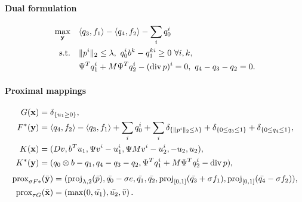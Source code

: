 \paragraph{Dual formulation}
\begin{align*}
    \max_{\mathbf{y}} \quad
        & \langle q_3, f_1 \rangle - \langle q_4, f_2 \rangle - \sum_i q_0^i  \\
    \text{s.t.}\quad
        & \|p^{i}\|_{2} \leq \lambda,
          ~q_0^i b^k - q_1^{ki} \geq 0 ~\forall i, k, \\
        & \Psi^T q_1^i + M \Psi^T q_2^i - (\operatorname{div} p)^i = 0,
          ~q_4 - q_3 - q_2 = 0.
\end{align*}

\paragraph{Proximal mappings}
\begin{align*}
    G(\mathbf{x}) &= \delta_{\{u_1 \geq 0\}}, \\
    F^*(\mathbf{y}) &= \langle q_4, f_2 \rangle - \langle q_3, f_1 \rangle
        + \sum_{i} q_0^i
        + \sum_{i} \delta_{\{\|p^{i}\|_{2} \leq \lambda\}}
        + \delta_{\{0 \leq q_3 \leq 1\}} + \delta_{\{0 \leq q_4 \leq 1\}}, \\
    K(\mathbf{x}) &= (
        Dv,
        b^T u_1,
        \Psi v^i - u_1^i,
        \Psi M v^i - u_2^i,
        -u_2,
        u_2
    ), \\
    K^*(\mathbf{y}) &= (
        q_0 \otimes b - q_1,
        q_4 - q_3 - q_2,
        \Psi^T q_1^i + M \Psi^T q_2^i - \operatorname{div}{p}
    ),
\end{align*}
\begin{align*}
    \operatorname{prox}_{\sigma F*}(\bar{\mathbf{y}})
    &= (
        \operatorname{proj}_{\lambda,2}(\bar{p}),
        \bar{q_0}-\sigma e,
        \bar{q_1},
        \bar{q_2},
        \operatorname{proj}_{[0,1]}(\bar{q_3} + \sigma f_1),
        \operatorname{proj}_{[0,1]}(\bar{q_4} - \sigma f_2)
   ), \\
    \operatorname{prox}_{\tau G}(\bar{\mathbf{x}})
    &= \left(
        \max(0,\bar{u_1}),
        \bar{u_2},
        \bar{v}
    \right).
\end{align*}
